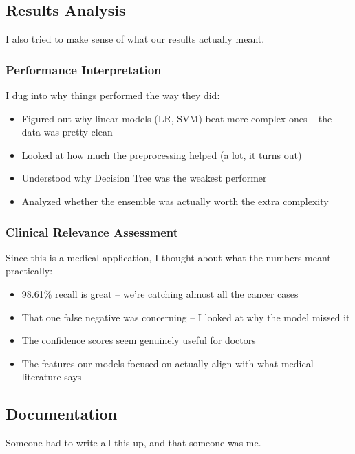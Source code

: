 \documentclass[12pt]{article}
\begin{document}
\subsection{Results Analysis}

I also tried to make sense of what our results actually meant.

\subsubsection{Performance Interpretation}
I dug into why things performed the way they did:
\begin{itemize}
    \item Figured out why linear models (LR, SVM) beat more complex ones -- the data was pretty clean
    \item Looked at how much the preprocessing helped (a lot, it turns out)
    \item Understood why Decision Tree was the weakest performer
    \item Analyzed whether the ensemble was actually worth the extra complexity
\end{itemize}

\subsubsection{Clinical Relevance Assessment}
Since this is a medical application, I thought about what the numbers meant practically:
\begin{itemize}
    \item 98.61\% recall is great -- we're catching almost all the cancer cases
    \item That one false negative was concerning -- I looked at why the model missed it
    \item The confidence scores seem genuinely useful for doctors
    \item The features our models focused on actually align with what medical literature says
\end{itemize}

\subsection{Documentation}

Someone had to write all this up, and that someone was me.
\end{document}

